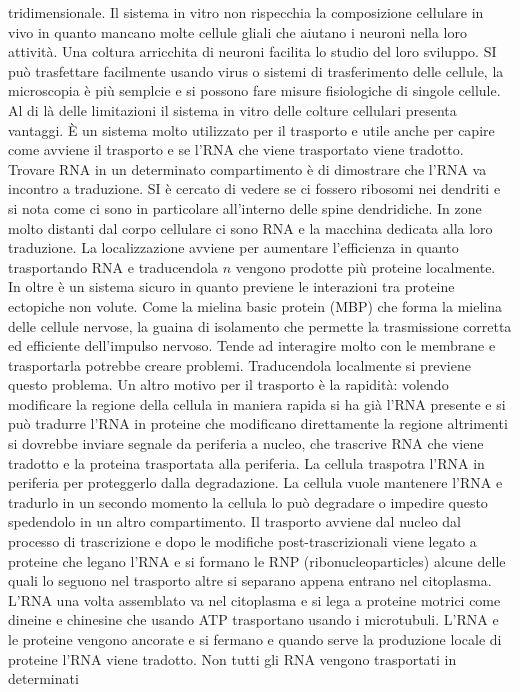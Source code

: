 tridimensionale. Il sistema in vitro non rispecchia la composizione cellulare in vivo in quanto mancano molte cellule gliali che aiutano i neuroni nella loro attivit\`a. Una coltura
arricchita di neuroni facilita lo studio del loro sviluppo. SI pu\`o trasfettare facilmente usando virus o sistemi di trasferimento delle cellule, la microscopia \`e pi\`u semplcie
e si possono fare misure fisiologiche di singole cellule. Al di l\`a delle limitazioni il sistema in vitro delle colture cellulari presenta vantaggi. \`E un sistema molto utilizzato 
per il trasporto e utile anche per capire come avviene il trasporto e se l'RNA che viene trasportato viene tradotto. Trovare RNA in un determinato compartimento \`e di dimostrare che 
l'RNA va incontro a traduzione. SI \`e cercato di vedere se ci fossero ribosomi nei dendriti e si nota come ci sono in particolare all'interno delle spine dendridiche. In zone molto
distanti dal corpo cellulare ci sono RNA e la macchina dedicata alla loro traduzione. La localizzazione avviene per aumentare l'efficienza in quanto trasportando RNA e traducendola
$n$ vengono prodotte pi\`u proteine localmente. In oltre \`e un sistema sicuro in quanto previene le interazioni tra proteine ectopiche non volute.  Come la mielina basic protein (MBP)
che forma la mielina delle cellule nervose, la guaina di isolamento che permette la trasmissione corretta ed efficiente dell'impulso nervoso. Tende ad interagire molto con le membrane
e trasportarla potrebbe creare problemi. Traducendola localmente si previene questo problema. Un altro motivo per il trasporto \`e la rapidit\`a: volendo modificare la regione della
cellula in maniera rapida si ha gi\`a l'RNA presente e si pu\`o tradurre l'RNA in proteine che modificano direttamente la regione altrimenti si dovrebbe inviare segnale da periferia a 
nucleo, che trascrive RNA che viene tradotto e la proteina trasportata alla periferia. La cellula traspotra l'RNA in periferia per proteggerlo dalla degradazione. La cellula vuole 
mantenere l'RNA e tradurlo in un secondo momento la cellula lo pu\`o degradare o impedire questo spedendolo in un altro compartimento. Il trasporto avviene dal nucleo dal processo di
trascrizione e dopo le modifiche post-trascrizionali viene legato a proteine che legano l'RNA e si formano le RNP (ribonucleoparticles) alcune delle quali lo seguono nel trasporto altre
si separano appena entrano nel citoplasma. L'RNA una volta assemblato va nel citoplasma e si lega a proteine motrici come dineine e chinesine che usando ATP trasportano usando i 
microtubuli. L'RNA e le proteine vengono ancorate e si fermano e quando serve la produzione locale di proteine l'RNA viene tradotto. Non tutti gli RNA vengono trasportati in determinati
